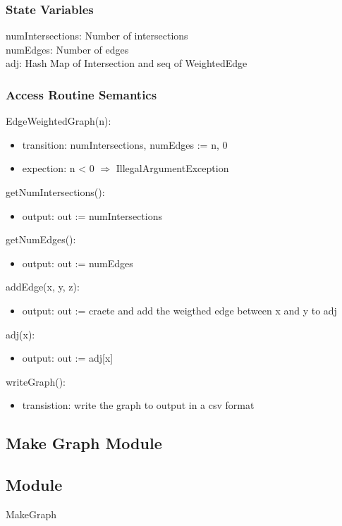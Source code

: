 \documentclass[12pt]{article}
\begin{document}
\subsubsection*{State Variables}
numIntersections: Number of intersections\\
numEdges: Number of edges\\
adj: Hash Map of Intersection and seq of WeightedEdge

\subsubsection*{Access Routine Semantics}
\noindent EdgeWeightedGraph(n):
\begin{itemize}
    \item transition: numIntersections, numEdges := n, 0
    \item expection: n < 0 $\Rightarrow$ IllegalArgumentException
\end{itemize}

\noindent getNumIntersections():
\begin{itemize}
    \item output: out := numIntersections
\end{itemize}

\noindent getNumEdges():
\begin{itemize}
    \item output: out := numEdges
\end{itemize}

\noindent addEdge(x, y, z):
\begin{itemize}
    \item output: out := craete and add the weigthed edge between x and y to adj
\end{itemize}

\noindent adj(x):
\begin{itemize}
    \item output: out := adj[x]
\end{itemize}

\noindent writeGraph():
\begin{itemize}
    \item transistion: write the graph to output in a csv format
\end{itemize}

\newpage
\subsection{Make Graph Module}
\subsection*{Module}
MakeGraph
\end{document}
